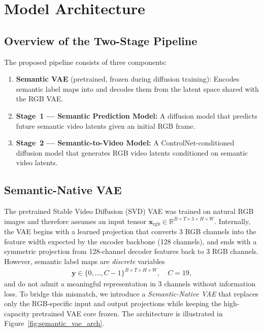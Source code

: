 \FloatBarrier
\section{Model Architecture}
\label{sec:architecture}

\subsection{Overview of the Two-Stage Pipeline}
\label{subsec:pipeline_overview}

The proposed pipeline consists of three components:

\begin{enumerate}
    \item \textbf{Semantic VAE} (pretrained, frozen during diffusion training): Encodes semantic label maps into and decodes them from the latent space shared with the RGB VAE.
    \item \textbf{Stage~1 --- Semantic Prediction Model:} A diffusion model that predicts future semantic video latents given an initial RGB frame.
    \item \textbf{Stage~2 --- Semantic-to-Video Model:} A ControlNet-conditioned diffusion model that generates RGB video latents conditioned on semantic video latents.
\end{enumerate}

\subsection{Semantic-Native VAE}
\label{subsec:semantic_native_vae}

The pretrained Stable Video Diffusion (SVD) VAE was trained on natural RGB images and therefore assumes an input tensor $\mathbf{x}_{\text{rgb}} \in \mathbb{R}^{B \times T \times 3 \times H \times W}$. Internally, the VAE begins with a learned projection that converts 3 RGB channels into the feature width expected by the encoder backbone (128 channels), and ends with a symmetric projection from 128-channel decoder features back to 3 RGB channels. However, semantic label maps are \emph{discrete} variables
\begin{align}
    \mathbf{y} \in \{0, \ldots, C-1\}^{B \times T \times H \times W}, \quad C = 19,
    \label{eq:semantic_input}
\end{align}
and do not admit a meaningful representation in 3 channels without information loss. To bridge this mismatch, we introduce a \emph{Semantic-Native VAE} that replaces only the RGB-specific input and output projections while keeping the high-capacity pretrained VAE core frozen. The architecture is illustrated in Figure~\ref{fig:semantic_vae_arch}.

